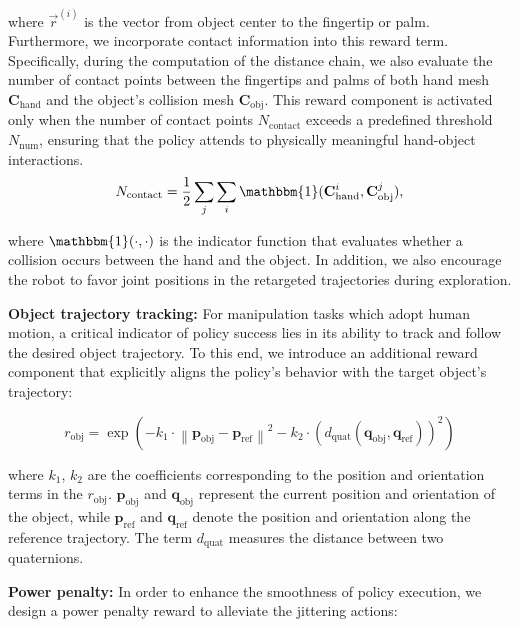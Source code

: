 where ${\vec{r}}^{(i)}$ is the vector from object center to the fingertip or palm. Furthermore, we incorporate contact information into this reward term.  Specifically, during the computation of the distance chain, we also evaluate the number of contact points between the fingertips and palms of both hand mesh $\mathbf{C}_{\text{hand}}$ and the object's collision mesh $\mathbf{C}_{\text{obj}}$. This reward component is activated only when the number of contact points $N_{\text{contact}}$ exceeds a predefined threshold $N_{\text{num}}$, ensuring that the policy attends to physically meaningful hand-object interactions.
\begin{equation}
    N_{\text{contact}} = \frac{1}{2}\sum_{j}\sum_i \mathbbm{1}(\mathbf{C}_{\text{hand}}^{i}, \mathbf{C}_{\text{obj}}^{j}),
\end{equation}






where $\mathbbm{1}(\cdot, \cdot)$ is the indicator function that evaluates whether a collision occurs between the hand and the object. In addition, we also encourage the robot to favor joint positions in the retargeted trajectories during exploration. 



\textbf{Object trajectory tracking:}
For manipulation tasks which adopt human motion, a critical indicator of policy success lies in its ability to track and follow the desired object trajectory. To this end, we introduce an additional reward component that explicitly aligns the policy’s behavior with the target object’s trajectory:

\begin{equation}
r_{\text{obj}} = \exp\left(-k_1 \cdot \left\| \mathbf{p}_{\text{obj}} - \mathbf{p}_{\text{ref}} \right\|^2 - k_2 \cdot \left( d_{\text{quat}}(\mathbf{q}_{\text{obj}}, \mathbf{q}_{\text{
ref
}}) \right)^2\right)
\end{equation}

where $k_{1}$, $k_{2}$ are the coefficients corresponding to the position and orientation terms in the $r_{\text{obj}}$.  $\mathbf{p}_{\text{obj}}$ and $\mathbf{q}_{\text{obj}}$ represent the current position and orientation of the object, while $\mathbf{p}_{\text{ref}}$ and $\mathbf{q}_{\text{ref}}$ denote the position and orientation along the reference trajectory. The term $d_{\text{quat}}$ measures the distance between two quaternions.


\textbf{Power penalty:} In order to enhance the smoothness of policy execution, we design a power penalty reward to alleviate the jittering actions:

